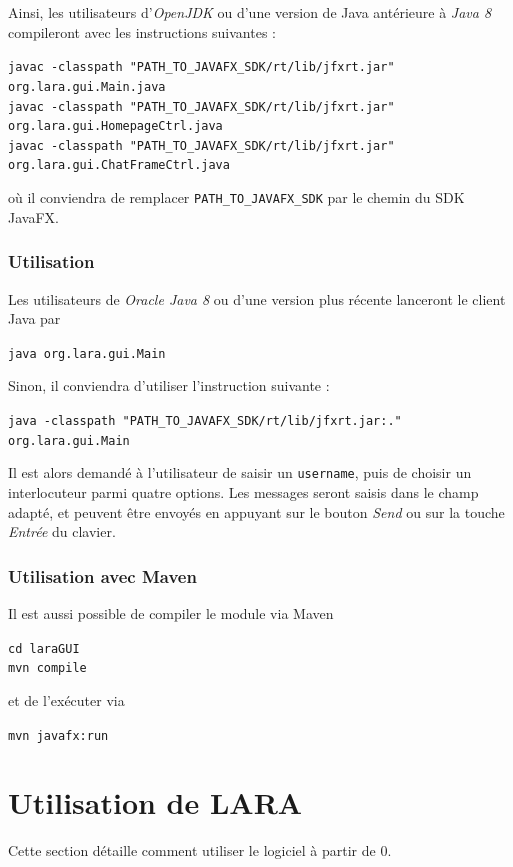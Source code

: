 \documentclass[10pt,a4paper]{article}
\begin{document}
Ainsi, les utilisateurs d'\textit{OpenJDK} ou d'une version de Java antérieure à \textit{Java 8} compileront avec les instructions suivantes :
\begin{center}
    \texttt{javac -classpath "PATH\_TO\_JAVAFX\_SDK/rt/lib/jfxrt.jar" org.lara.gui.Main.java} \\
    \texttt{javac -classpath "PATH\_TO\_JAVAFX\_SDK/rt/lib/jfxrt.jar" org.lara.gui.HomepageCtrl.java} \\
    \texttt{javac -classpath "PATH\_TO\_JAVAFX\_SDK/rt/lib/jfxrt.jar" org.lara.gui.ChatFrameCtrl.java}
\end{center}
où il conviendra de remplacer \texttt{PATH\_TO\_JAVAFX\_SDK} par le chemin du SDK JavaFX. 

\subsubsection{Utilisation}

Les utilisateurs de \textit{Oracle Java 8} ou d'une version plus récente lanceront le client Java par
\begin{center}
    \texttt{java org.lara.gui.Main}
\end{center}

Sinon, il conviendra d'utiliser l'instruction suivante :
\begin{center}
    \texttt{java -classpath "PATH\_TO\_JAVAFX\_SDK/rt/lib/jfxrt.jar:." org.lara.gui.Main}
\end{center}

Il est alors demandé à l'utilisateur de saisir un \texttt{username}, puis de choisir un interlocuteur parmi quatre options. Les messages seront saisis dans le champ adapté, et peuvent être envoyés en appuyant sur le bouton \textit{Send} ou sur la touche \textit{Entrée} du clavier.

\subsubsection{Utilisation avec Maven}
Il est aussi possible de compiler le module via Maven
\begin{center}
\texttt{cd laraGUI} \\
\texttt{mvn compile}
\end{center}
et de l'exécuter via
\begin{center}
\texttt{mvn javafx:run}
\end{center}


\section{Utilisation de LARA}
Cette section détaille comment utiliser le logiciel à partir de 0.
\end{document}
